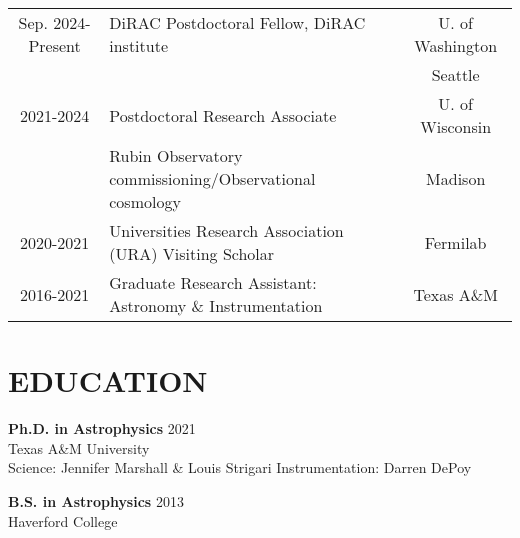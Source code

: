 \documentclass[11pt,letterpaper, sans]{moderncv}        %
\begin{document}
\begin{centering}
    \begin{tabular}{c l c}
        \vspace{1mm}
        Sep. 2024-Present & DiRAC Postdoctoral Fellow, DiRAC institute & U. of Washington
        \vspace{-1mm}\\
        && Seattle 
        \vspace{2mm}\\
        2021-2024 & Postdoctoral Research Associate  & U. of Wisconsin
        \vspace{-1mm}\\
        & Rubin Observatory commissioning/Observational cosmology &  Madison
        \vspace{2mm}\\
        2020-2021 & Universities Research Association (URA) Visiting Scholar & Fermilab
        \vspace{2mm}\\
        2016-2021 & Graduate Research Assistant: Astronomy \& Instrumentation &Texas A\&M\\
    \end{tabular}
\end{centering}

\section{EDUCATION}

\textbf{Ph.D. in Astrophysics} \hfill 2021\\
Texas A\&M University \hfill \\
Science: Jennifer Marshall \& Louis Strigari  \quad \quad \quad Instrumentation:  Darren DePoy %
\vspace*{2mm}

\textbf{B.S. in Astrophysics} \hfill 2013\\
Haverford College

\vspace*{-4mm}
\end{document}
